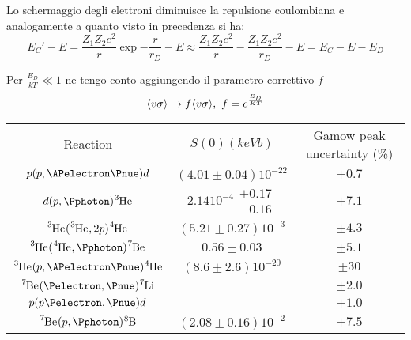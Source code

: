 \documentclass[../main.tex]{subfiles}
\begin{document}
Lo schermaggio degli elettroni diminuisce la repulsione coulombiana e analogamente a quanto visto in precedenza si ha:
\begin{equation}
E_C'-E=\frac{Z_1Z_2e^2}{r}\exp{-\frac{r}{r_D}}-E\approx\frac{Z_1Z_2e^2}{r}-\frac{Z_1Z_2e^2}{r_D}-E=E_C-E-E_D
\end{equation}

Per $\frac{E_D}{kT}\ll1$ ne tengo conto aggiungendo il parametro correttivo $f$
\begin{equation}
\exv{v\sigma}\to f\exv{v\sigma},\ f=\exp{\frac{E_D}{KT}}
\end{equation}

\begin{workout}



\begin{adjustbox}{max width=0.4\textwidth,keepaspectratio,caption={Reaction rate \cite{adelberger2011solar}.},float=table}

\begin{threeparttable}

\begin{tabular}{|ccc|}
{Reaction} & {$S(0) (keVb)$} & {\parbox{2cm}{Gamow peak uncertainty (\%)}}\\
{$p(p,\APelectron\Pnue)d$} & {$(4.01 \pm 0.04)10^{-22}$} & {$\pm 0.7$}\\
$d(p,\Pphoton)\cel{He}{3}{}{}$ & ${2.14}10^{-4}\substack{+0.17 \\ -0.16}$ & $\pm 7.1$\\
$\cel{He}{3}{}{}(\cel{He}{3}{}{},2p)\cel{He}{4}{}{}$ & $(5.21 \pm 0.27)10^{-3}$ & $\pm 4.3$\\
$\cel{He}{3}{}{}(\cel{He}{4}{}{},\Pphoton)\cel{Be}{7}{}{}$ & $0.56 \pm 0.03$ & $\pm 5.1$\\
$\cel{He}{3}{}{}(p,\APelectron\Pnue)\cel{He}{4}{}{}$ & $(8.6 \pm 2.6)10^{-20}$ & $\pm 30$\\
$\cel{Be}{7}{}{}(\Pelectron,\Pnue)\cel{Li}{7}{}{}$ & $ $  & $\pm 2.0$\\
$p(p\Pelectron,\Pnue)d$\tnote{1}& $ $ & $\pm 1.0$\\
$\cel{Be}{7}{}{}(p,\Pphoton)\cel{B}{8}{}{}$\tnote{2}& $(2.08 \pm 0.16)10^{-2}$ & $\pm 7.5$\\
\end{tabular}


\end{threeparttable}
\end{adjustbox}
\end{workout}
\end{document}
